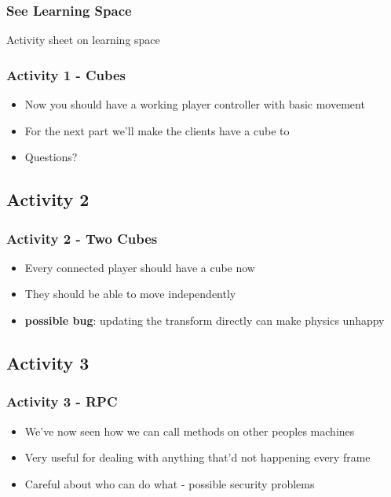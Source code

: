 \begin{frame}
	\frametitle{See Learning Space}
	
	\begin{center}
		Activity sheet on learning space
	\end{center}
	
\end{frame}

\begin{frame}
	\frametitle{Activity 1 - Cubes}
	
	\begin{itemize}
		\item Now you should have a working player controller with basic movement
		\item For the next part we'll make the clients have a cube to
		\item Questions?
	\end{itemize}
\end{frame}

\subsection{Activity 2}

\begin{frame}
	\frametitle{Activity 2 - Two Cubes}
	
	\begin{itemize}
		\item Every connected player should have a cube now
		\item They should be able to move independently
		\item \textbf{possible bug}: updating the transform directly can make physics unhappy 
	\end{itemize}
\end{frame}

\subsection{Activity 3}

\begin{frame}
	\frametitle{Activity 3 - RPC }
	
	\begin{itemize}
		\item We've now seen how we can call methods on other peoples machines
		\item Very useful for dealing with anything that'd not happening every frame
		\item Careful about who can do what - possible security problems
	\end{itemize}
	
\end{frame}

